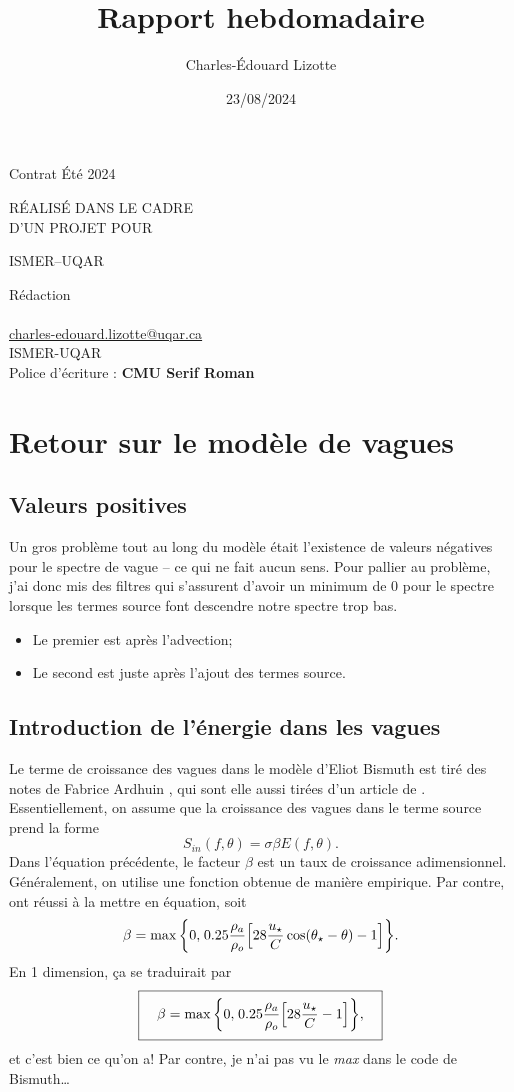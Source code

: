 \documentclass[10pt]{article}
\author{Charles-Édouard Lizotte}
\date{23/08/2024}
\title{Rapport hebdomadaire}
\makeatletter
\numberwithin{equation}{section}
\newcommand{\venti}{\vphantom{\sum_x^x}}
\newcommand{\pt}{\hspace{1pt}} %
\newcommand{\mytitlepage}{
\begin{titlepage}
\begin{center}
{\Huge \thesubtitle \par}
\vspace{2cm}
{\Huge \MakeUppercase{\thetitle} \par}
\vspace{2cm}
RÉALISÉ DANS LE CADRE\\ D'UN PROJET POUR \par
\vspace{2cm}
{\Huge ISMER--UQAR \par}
\vspace{2cm}
{\thedate}
\end{center}
\vfill
Rédaction \\
{\theauthor}\\
\url{charles-edouard.lizotte@uqar.ca}\\
ISMER-UQAR\\
Police d'écriture : \textbf{CMU Serif Roman}
\end{titlepage}
}
\newcommand{\thesubtitle}{Contrat Été 2024}
\makeatother
\begin{document}
\mytitlepage
\tableofcontents\newpage
\section{Retour sur le modèle de vagues}
\label{sec:org19f8e3d}

\subsection{Valeurs positives}
\label{sec:org9f1f382}

Un gros problème tout au long du modèle était l'existence de valeurs négatives pour le spectre de vague -- ce qui ne fait aucun sens.
Pour pallier au problème, j'ai donc mis des filtres qui s'assurent d'avoir un minimum de 0 pour le spectre lorsque les termes source font descendre notre spectre trop bas.
\begin{itemize}
\item Le premier est après l'advection;
\item Le second est juste après l'ajout des termes source.
\end{itemize}
\subsection{Introduction de l'énergie dans les vagues}
\label{sec:orgff35544}

Le terme de croissance des vagues dans le modèle d'Eliot Bismuth est tiré des notes de Fabrice Ardhuin \autocite{Ardhuin2024ocean}, qui sont elle aussi tirées d'un article de \Textcite{snyder1981array}.
Essentiellement, on assume que la croissance des vagues dans le terme source prend la forme
\begin{equation}
   S_{in}(f,\theta) = \sigma \beta E(f,\theta). 
\end{equation}
Dans l'équation précédente, le facteur \(\beta\) est un taux de croissance adimensionnel.
Généralement, on utilise une fonction obtenue de manière empirique.
Par contre, \Textcite{snyder1981array} ont réussi à la mettre en équation, soit
\begin{equation}
   \beta = \max \qty{0,\pt0.25\frac{\rho_a}{\rho_o} \qty[28\frac{u_\star}{C} \cos(\theta_\star - \theta) - 1]}.
\end{equation}
En 1 dimension, ça se traduirait par
\begin{equation}
   \boxed{\venti\quad\beta = \max \qty{0,\pt0.25\frac{\rho_a}{\rho_o} \qty[28\frac{u_\star}{C} - 1]},\quad}
\end{equation}
et c'est bien ce qu'on a! Par contre, je n'ai pas vu le \emph{max} dans le code de Bismuth\ldots{}
\end{document}
